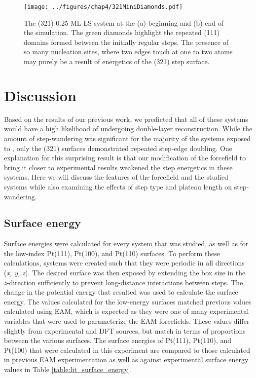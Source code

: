 \begin{figure}
\centering
\texttt{[image: ../figures/chap4/321MiniDiamonds.pdf]}
\caption{The (321) 0.25 ML LS system at the (a) beginning and
(b) end of the simulation. The green diamonds highlight the repeated (111) domains formed
between the initially regular steps. The presence of so many nucleation sites,
where two edges touch at one to two atoms may purely be a result of energetics
of the (321) step surface.}
\label{fig:diamonds}
\end{figure}

\section{Discussion}
Based on the results of our previous work\citep{Michalka:2013aa}, we predicted
that all of these systems would have a high likelihood of undergoing
double-layer reconstruction. While the amount of step-wandering was significant
for the majority of the systems exposed to , only the (321) surfaces
demonstrated repeated step-edge doubling. One explanation for this surprising
result is that our modification of the  forcefield to bring it
closer to experimental results weakened the  step energetics
in these systems. Here we will discuss the features of the forcefield and the
studied systems while also examining the effects of step type and plateau
length on step-wandering.

\subsection{Surface energy}
Surface energies were calculated for every system that was studied, as well as
for the low-index Pt(111), Pt(100), and Pt(110) surfaces.  To perform these
calculations, systems were created such that they were periodic in all
directions ({\em x, y, z}). The desired surface was then exposed by extending
the box size in the {\em z}-direction sufficiently to prevent long-distance
interactions between steps.  The change in the potential energy that resulted
was used to calculate the surface energy.  The values calculated for the
low-energy surfaces matched previous values calculated using EAM, which is
expected as they were one of many experimental variables that were used to
parameterize the EAM forcefields.\citep{Foiles:1986ky} These values differ
slightly from experimental\citep{Tyson:1977xe, De-Boer:1988tg, Galeev:1980pt} and
DFT\citep{Vitos:1998qq} sources, but match in terms of proportions between the
various surfaces.  The surface energies of Pt(111), Pt(110), and Pt(100) that
were calculated in this experiment are compared to those calculated in previous
EAM experimentation \citep{Foiles:1986ky} as well as against experimental
surface energy values in Table \ref{table:lit_surface_energy}.

